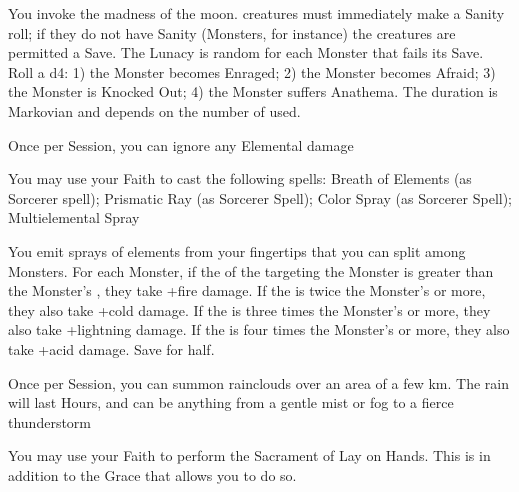 {You invoke the madness of the moon.  \DICE creatures must immediately make a Sanity roll; if they do not have Sanity (Monsters, for instance) the creatures are permitted a Save.
The Lunacy is random for each Monster that fails its Save.  Roll a d4:  1) the Monster becomes Enraged; 2) the Monster becomes Afraid; 3) the Monster is Knocked Out; 4) the Monster suffers Anathema.  The duration is Markovian and depends on the number of \DICE used.


\GOD[
Name=Tiamat,
Link=small-god-tiamat,
GodOf=Fiendish Prince of Tempests,
Holy=a five pointed star worn from a necklace
]


Once per Session, you can ignore any Elemental damage


You may use your Faith to cast the following spells: Breath of Elements (as Sorcerer spell); Prismatic Ray (as Sorcerer Spell); Color Spray (as Sorcerer Spell); Multielemental Spray


\LITURGY [
  Name= Multielemental Spray,
  Link= tiamat-liturgy-multielemental-spray,
  Paradigm= Elements ,
  Save=  Y (half) ,
  Duration= 0 ,
  Counter=  n/a  ,
  Keywords= Splittable ,
  Target=   Close or Nearby Monster(s)
]



You emit \DICE sprays of elements from your fingertips that you can split among \DICE Monsters.  For each Monster, if the \SUMDICE of the \DICE targeting the Monster is greater than the Monster's \HD, they take \DICE+\DICE fire damage.  If the \SUMDICE is twice the Monster's \HD or more, they also take \DICE+\DICE cold damage.  If the \SUMDICE is three times the Monster's \HD or more, they also take \DICE+\DICE lightning damage.  If the \SUMDICE is four times the Monster's \HD or more, they also take \DICE+\DICE acid damage.  Save for half.


\GOD[
Name=Tlaloc,
Link=small-god-tlaloc,
GodOf=Archon of the Rains,
Holy=a wreath of ferns and mosses
]


Once per Session, you can summon rainclouds over an area of a few km.  The rain will last Hours, and can be anything from a gentle mist or fog to a fierce thunderstorm


You may use your Faith to perform the Sacrament of Lay on Hands.  This is in addition to the Grace that allows you to do so.

}

